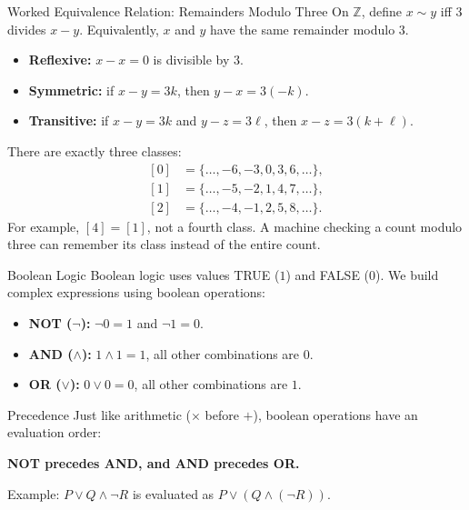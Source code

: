 \documentclass[10pt]{beamer}
\begin{document}
\begin{frame}{Worked Equivalence Relation: Remainders Modulo Three}
  \small
  On $\mathbb{Z}$, define $x\sim y$ iff $3$ divides $x-y$.
  Equivalently, $x$ and $y$ have the same remainder modulo $3$.
  \begin{itemize}
    \item \textbf{Reflexive:} $x-x=0$ is divisible by $3$.
    \item \textbf{Symmetric:} if $x-y=3k$, then $y-x=3(-k)$.
    \item \textbf{Transitive:} if $x-y=3k$ and $y-z=3\ell$,
      then $x-z=3(k+\ell)$.
  \end{itemize}
  \pause
  There are exactly three classes:
  \[
    \begin{aligned}
      {}[0]&=\{\ldots,-6,-3,0,3,6,\ldots\},\\
      [1]&=\{\ldots,-5,-2,1,4,7,\ldots\},\\
      [2]&=\{\ldots,-4,-1,2,5,8,\ldots\}.
    \end{aligned}
  \]
  \pause
  For example, $[4]=[1]$, not a fourth class. A machine checking a count
  modulo three can remember its class instead of the entire count.
\end{frame}

\begin{frame}{Boolean Logic}
  \small
  Boolean logic uses values TRUE ($1$) and FALSE ($0$). We build complex expressions using boolean operations:
  \pause
  \begin{itemize}
      \item \textbf{NOT ($\neg$):} $\neg 0 = 1$ and $\neg 1 = 0$.
      \item \textbf{AND ($\wedge$):} $1 \wedge 1 = 1$, all other combinations are $0$.
      \item \textbf{OR ($\vee$):} $0 \vee 0 = 0$, all other combinations are $1$.
  \end{itemize}
  \pause
  \begin{block}{Precedence}
    Just like arithmetic ($\times$ before $+$), boolean operations have an evaluation order: 
    \begin{center}
      \textbf{NOT precedes AND, and AND precedes OR.}
    \end{center}
    Example: $P \vee Q \wedge \neg R$ is evaluated as $P \vee (Q \wedge (\neg R))$.
  \end{block}
\end{frame}
\end{document}
